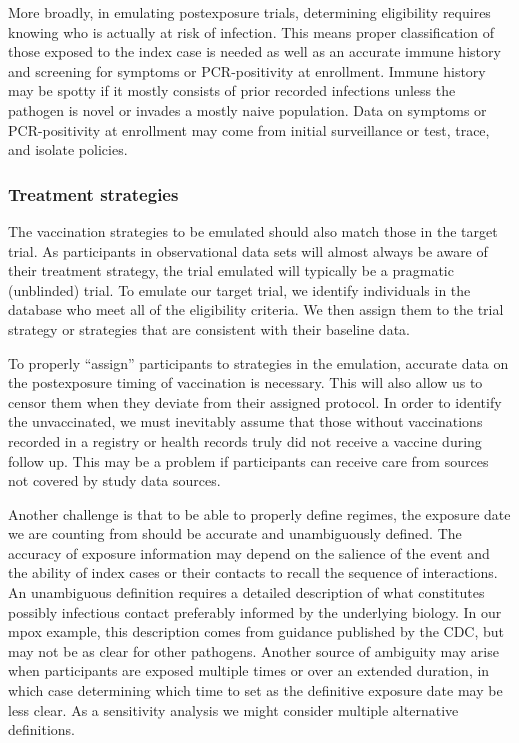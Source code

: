 \documentclass[11pt]{article}
\begin{document}
More broadly, in emulating postexposure trials, determining eligibility requires knowing who is actually at risk of infection. This means proper classification of those exposed to the index case is needed as well as an accurate immune history and screening for symptoms or PCR-positivity at enrollment. Immune history may be spotty if it mostly consists of prior recorded infections unless the pathogen is novel or invades a mostly naive population. Data on symptoms or PCR-positivity at enrollment may come from initial surveillance or test, trace, and isolate policies. 

\subsubsection*{Treatment strategies}
The vaccination strategies to be emulated should also match those in the target trial. As participants in observational data sets will almost always be aware of their treatment strategy, the trial emulated will typically be a pragmatic (unblinded) trial. To emulate our target trial, we identify individuals in the database who meet all of the eligibility criteria. We then assign them to the trial strategy or strategies that are consistent with their baseline data.

To properly ``assign'' participants to strategies in the emulation, accurate data on the postexposure timing of vaccination is necessary. This will also allow us to censor them when they deviate from their assigned protocol. In order to identify the unvaccinated, we must inevitably assume that those without vaccinations recorded in a registry or health records truly did not receive a vaccine during follow up. This may be a problem if participants can receive care from sources not covered by study data sources. 

Another challenge is that to be able to properly define regimes, the exposure date we are counting from should be accurate and unambiguously defined. The accuracy of exposure information may depend on the salience of the event and the ability of index cases or their contacts to recall the sequence of interactions. An unambiguous definition requires a detailed description of what constitutes possibly infectious contact preferably informed by the underlying biology. In our mpox example, this description comes from guidance published by the CDC, but may not be as clear for other pathogens. Another source of ambiguity may arise when participants are exposed multiple times or over an extended duration, in which case determining which time to set as the definitive exposure date may be less clear. As a sensitivity analysis we might consider multiple alternative definitions.
\end{document}
